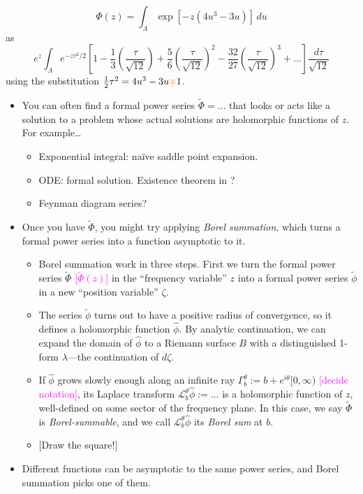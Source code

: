 \documentclass{article}
\newcommand{\laplace}{\mathcal{L}}
\begin{document}
\[ \Phi(z) = \int_{\Lambda} \exp\left[-z \left(4u^3 - 3u\right)\right]\,du \]
as
\[ e^z \int_{\Lambda} e^{-z\tau^2/2} \left[ 1 - \frac{1}{3} \left(\frac{\tau}{\sqrt{12}}\right) + \frac{5}{6} \left(\frac{\tau}{\sqrt{12}}\right)^2 - \frac{32}{27} \left(\frac{\tau}{\sqrt{12}}\right)^3 + \ldots \right] \frac{d\tau}{\sqrt{12}} \]
using the substitution $\tfrac{1}{2} \tau^2 = 4u^3 - 3u \textcolor{orange}{\mp} 1$.
\begin{itemize}
\item You can often find a formal power series $\tilde{\Phi} = \ldots$ that looks or acts like a solution to a problem whose actual solutions are holomorphic functions of $z$. For example\ldots
\begin{itemize}
\item Exponential integral: na\"{i}ve saddle point expansion.
\item ODE: formal solution. Existence theorem in \cite{diverg-resurg-iii}?
\item Feynman diagram series?
\end{itemize}
\item Once you have $\tilde{\Phi}$, you might try applying {\em Borel summation}, which turns a formal power series into a function asymptotic to it.
\begin{itemize}
\item Borel summation work in three steps. First we turn the formal power series $\tilde{\Phi}$ \textcolor{magenta}{[$\tilde{\Phi}(z)$]} in the ``frequency variable'' $z$ into a formal power series $\tilde{\phi}$ in a new ``position variable'' $\zeta$.
\item The series $\tilde{\phi}$ turns out to have a positive radius of convergence, so it defines a holomorphic function $\hat{\phi}$. By analytic continuation, we can expand the domain of $\hat{\phi}$ to a Riemann surface $B$ with a distinguished 1-form $\lambda$---the continuation of $d\zeta$.
\item If $\hat{\phi}$ grows slowly enough along an infinite ray $\Gamma_b^\theta := b + e^{i\theta}[0, \infty)$ \textcolor{magenta}{[decide notation]}, its Laplace transform $\laplace_b^\theta \hat{\phi} := \ldots$ is a holomorphic function of $z$, well-defined on some sector of the frequency plane. In this case, we say $\tilde{\Phi}$ is {\em Borel-summable}, and we call $\laplace_b^\theta \hat{\phi}$ its {\em Borel sum} at $b$.
\item {[Draw the square!]}
\end{itemize}
\item Different functions can be asymptotic to the same power series, and Borel summation picks one of them.

\end{itemize}
\end{document}
